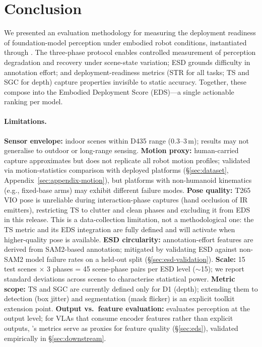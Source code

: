 \section{Conclusion}
\label{sec:conclusion}

We presented an evaluation methodology for measuring the deployment readiness of foundation-model perception under embodied robot conditions, instantiated through \coolname{}.
The three-phase protocol enables controlled measurement of perception degradation and recovery under scene-state variation; ESD grounds difficulty in annotation effort; and deployment-readiness metrics (STR for all tasks; TS and SGC for depth) capture properties invisible to static accuracy.
Together, these compose into the Embodied Deployment Score (EDS)---a single actionable ranking per model.


\paragraph{Limitations.}
\textbf{Sensor envelope:} indoor scenes within D435 range (0.3--3\,m); results may not generalise to outdoor or long-range sensing.
\textbf{Motion proxy:} human-carried capture approximates but does not replicate all robot motion profiles; validated via motion-statistics comparison with deployed platforms (\S\ref{sec:dataset}, Appendix~\ref{sec:appendix-motion}), but platforms with non-humanoid kinematics (e.g., fixed-base arms) may exhibit different failure modes.
\textbf{Pose quality:} T265 VIO pose is unreliable during interaction-phase captures (hand occlusion of IR emitters), restricting TS to clutter and clean phases and excluding it from EDS in this release. This is a data-collection limitation, not a methodological one: the TS metric and its EDS integration are fully defined and will activate when higher-quality pose is available.
\textbf{ESD circularity:} annotation-effort features are derived from SAM2-based annotation; mitigated by validating ESD against non-SAM2 model failure rates on a held-out split (\S\ref{sec:esd-validation}).
\textbf{Scale:} 15 test scenes $\times$ 3 phases = 45 scene-phase pairs per ESD level (${\sim}$15); we report standard deviations across scenes to characterise statistical power.
\textbf{Metric scope:} TS and SGC are currently defined only for D1 (depth); extending them to detection (box jitter) and segmentation (mask flicker) is an explicit toolkit extension point.
\textbf{Output vs.\ feature evaluation:} \coolname{} evaluates perception at the output level; for VLAs that consume encoder features rather than explicit outputs, \coolname{}'s metrics serve as proxies for feature quality (\S\ref{sec:eds}), validated empirically in \S\ref{sec:downstream}.

